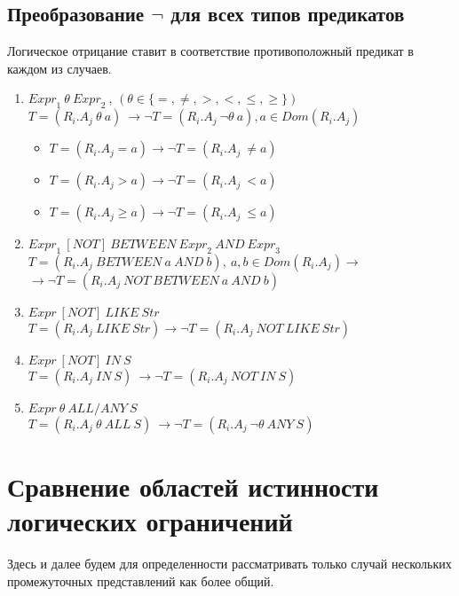 \documentclass[10pt,a4paper]{article}
\def \n #1{\mathit{#1}}
\begin{document}
\subsection{Преобразование $\neg$ для всех типов предикатов}
Логическое отрицание ставит в соответствие противоположный предикат в каждом из случаев.
\begin{enumerate}
  \item $ \n{Expr}_1\ \theta\ \n{Expr}_2\ $, $(\theta \in \{=, \neq, >, <, \leq, \geq\})$\\
  $T = (\n{R_i.A_j}\ \theta\ a)\ \rightarrow \neg T = (\n{R_i.A_j}\ \neg \theta\ a),
  a \in Dom(R_i.A_j)$
    \begin{itemize}
      \item $T = (\n{R_i.A_j} = a) \rightarrow \neg T =  (\n{R_i.A_j}\ \neq a)$
      \item $T = (\n{R_i.A_j} > a) \rightarrow \neg T =  (\n{R_i.A_j}\ < a)$
      \item $T = (\n{R_i.A_j} \geq a) \rightarrow \neg T = (\n{R_i.A_j}\ \leq
      a)$
    \end{itemize}
  \item $\n{Expr}_1\ \n{[NOT]}\ \n{BETWEEN}\ \n{Expr}_2\ \n{AND}\ \n{Expr}_3$\\
  $T = (\n{R_i.A_j}\ \n{BETWEEN}\ a\ \n{AND}\ b),\ a, b \in Dom(R_i.A_j) \rightarrow$\\
  $\rightarrow \neg T = (\n{R_i.A_j}\ \n{NOT}\ \n{BETWEEN}\ a\ \n{AND}\ b)$
  \item $\n{Expr}\ \n{[NOT]}\ \n{LIKE}\ \n{Str}$\\
  $T = (\n{R_i.A_j}\ \n{LIKE}\ \n{Str}) \rightarrow \neg T = (\n{R_i.A_j}\ \n{NOT}\ \n{LIKE}\
  \n{Str})$
  \item $\n{Expr}\ \n{[NOT]}\ \n{IN}\ S$\\
  $T = (\n{R_i.A_j}\ \n{IN}\ S)\ \rightarrow \neg T = (\n{R_i.A_j}\ \n{NOT}\ \n{IN}\ S)$
  \item $\n{Expr}\ \theta\ \n{ALL/ANY}\ S$\\
  $T = (\n{R_i.A_j}\ \theta\ \n{ALL}\ S)\ \rightarrow \neg T = (\n{R_i.A_j}\ \neg \theta\ \n{ANY}\ S
  )$
\end{enumerate}


\section{Сравнение областей истинности логических ограничений}
Здесь и далее будем для определенности рассматривать только случай нескольких промежуточных
представлений как более общий.
\end{document}
